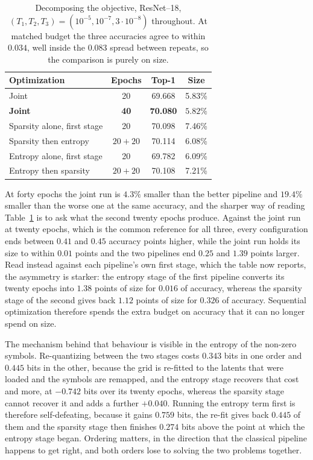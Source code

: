 \documentclass{article}
\begin{document}
\begin{table}[ht]
  \caption{Decomposing the objective, ResNet--18, $(T_1,T_2,T_3)=(10^{-5},10^{-7},
  3\cdot10^{-8})$ throughout. At matched budget the three accuracies agree to
  within $0.034$, well inside the $0.083$ spread between repeats, so the comparison is
  purely on size.}
  \label{tab:pipeline}
  \centering \small
  \begin{tabular}{lccc}
    \toprule
    Optimization & Epochs & Top-1 & Size \\
    \midrule
    Joint & 20 & 69.668 & 5.83\% \\
    \textbf{Joint} & \textbf{40} & \textbf{70.080} & $\mathbf{5.82\%}$ \\
    \addlinespace
    Sparsity alone, first stage & 20 & 70.098 & 7.46\% \\
    Sparsity then entropy & $20+20$ & 70.114 & 6.08\% \\
    \addlinespace
    Entropy alone, first stage & 20 & 69.782 & 6.09\% \\
    Entropy then sparsity & $20+20$ & 70.108 & 7.21\% \\
    \bottomrule
  \end{tabular}
\end{table}

At forty epochs the joint run is $4.3\%$ smaller than the better pipeline and
$19.4\%$ smaller than the worse one at the same accuracy, and the sharper way of
reading Table~\ref{tab:pipeline} is to ask what the second twenty epochs produce.
Against the joint run at twenty epochs, which is the common reference for all
three, every configuration ends between $0.41$ and $0.45$ accuracy points higher,
while the joint run holds its size to within $0.01$ points and the two pipelines
end $0.25$ and $1.39$ points larger. Read instead against each pipeline's own
first stage, which the table now reports, the asymmetry is starker: the entropy
stage of the first pipeline converts its twenty epochs into $1.38$ points of size
for $0.016$ of accuracy, whereas the sparsity stage of the second gives back
$1.12$ points of size for $0.326$ of accuracy. Sequential optimization therefore
spends the extra budget on accuracy that it can no longer spend on size.

The mechanism behind that behaviour is visible in the entropy of the non-zero
symbols. Re-quantizing between the two stages costs $0.343$ bits in one order and
$0.445$ bits in the other, because the grid is re-fitted to the latents that were
loaded and the symbols are remapped, and the entropy stage recovers that cost and
more, at $-0.742$ bits over its twenty epochs, whereas the sparsity stage cannot
recover it and adds a further $+0.040$. Running the entropy term first is
therefore self-defeating, because it gains $0.759$ bits, the re-fit gives back
$0.445$ of them and the sparsity stage then finishes $0.274$ bits above the point
at which the entropy stage began. Ordering matters, in the direction that the
classical pipeline happens to get right, and both orders lose to solving the two
problems together.
\end{document}
